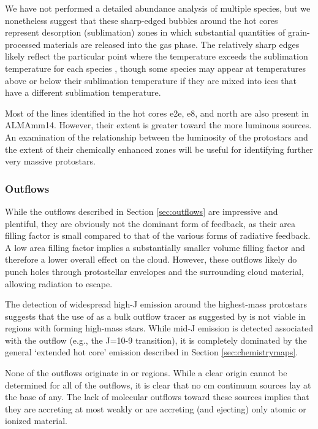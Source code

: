 \documentclass{emulateapj}
\begin{document}
We have not performed a detailed abundance analysis of multiple species, but we
nonetheless suggest that these sharp-edged bubbles around the hot cores
represent desorption (sublimation) zones in which substantial quantities of
grain-processed materials are released into the gas phase.  The relatively
sharp edges likely reflect the particular point where the temperature exceeds
the sublimation temperature for each species \citep{Garrod2006a,Green2009a},
though some species may appear at temperatures above or below their sublimation
temperature if they are mixed into ices that have a different sublimation
temperature.

Most of the lines identified in the hot cores e2e, e8, and north are also
present in ALMAmm14.  However, their extent is greater toward the more luminous
sources.  An examination of the relationship between the luminosity of the
protostars and the extent of their chemically enhanced zones will be useful for
identifying further very massive protostars.


\subsubsection{Outflows}
\label{sec:outflowdiscussion}
While the outflows described in Section \ref{sec:outflows} are impressive and
plentiful, they are obviously not the dominant form of feedback, as their area
filling factor is small compared to that of the various forms of radiative
feedback.  A low area filling factor implies a substantially smaller volume
filling factor and therefore a lower overall effect on the cloud.  However,
these outflows likely do punch holes through protostellar envelopes and the
surrounding cloud material, allowing radiation to escape.

The detection of widespread high-J \methanol emission around the highest-mass
protostars suggests that the use of \methanol as a bulk outflow tracer as
suggested by \citet{Kristensen2015a} is not viable in regions with forming
high-mass stars.  While mid-J \methanol emission is detected associated with
the outflow (e.g., the J=10-9 transition), it is completely dominated by the
general `extended hot core' emission described in Section
\ref{sec:chemistrymaps}.

None of the outflows originate in \uchii or \hchii regions.  While a clear
origin cannot be determined for all of the outflows, it is clear that no cm
continuum sources lay at the base of any.  The lack of molecular outflows
toward these sources implies that they are accreting at most weakly or are
accreting (and ejecting) only atomic or ionized material.
\end{document}
